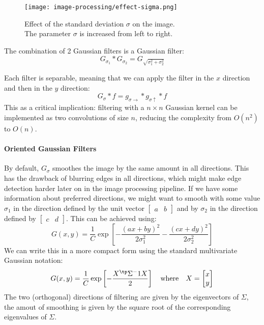 \begin{figure}[H]
    \centering
    \texttt{[image: image-processing/effect-sigma.png]}
    \caption{Effect of the standard deviation $\sigma$ on the image.\\ The parameter $\sigma$ is increased from left to right.}
\end{figure}

The combination of 2 Gaussian filters is a Gaussian filter:
\begin{equation*}
    G_{\sigma_1} * G_{\sigma_2} = G_{\sqrt{\sigma_1^2+\sigma_2^2}}
\end{equation*}

Each filter is separable, meaning that we can apply the filter in the $x$ direction and then in the $y$ direction:
\begin{equation*}
    G_\sigma*f = g_{\sigma\rightarrow}*g_{\sigma\uparrow}*f
\end{equation*}
This as a critical implication: filtering with a $n\times n$ Gaussian kernel can be implemented as two convolutions of size $n$, reducing the complexity from $O(n^2)$ to $O(n)$.

\paragraph*{Oriented Gaussian Filters}
By default, $G_\sigma$ smoothes the image by the same amount in all directions. This has the drawback of blurring edges in all directions, which might make edge detection harder later on in the image processing pipeline. If we have some information about preferred directions, we might want to smooth with some value $\sigma_1$ in the direction defined by the unit vector $\begin{bmatrix}a&b\end{bmatrix}$ and by $\sigma_2$ in the direction defined by $\begin{bmatrix}c&d\end{bmatrix}$. This can be achieved using:
\begin{equation*}
    G(x, y) = \frac{1}{C}\exp\left[-\frac{(ax+by)^2}{2\sigma_1^2}-\frac{(cx+dy)^2}{2\sigma_2^2}\right]
\end{equation*}
We can write this in a more compact form using the standard multivariate Gaussian notation:
\begin{equation*}
    G(x, y) = \frac{1}{C}\exp\left[-\frac{X^\tp\Sigma^-1 X}{2}\right] \quad\text{where}\quad X = \begin{bmatrix}
        x\\ y
    \end{bmatrix}
\end{equation*}
The two (orthogonal) directions of filtering are given by the eigenvectors of $\Sigma$, the amout of smoothing is given by the square root of the corresponding eigenvalues of $\Sigma$.


